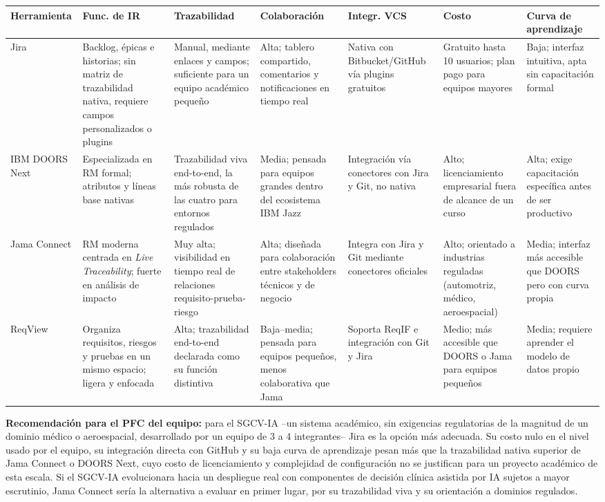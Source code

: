 \documentclass[11pt,a4paper]{article}
\begin{document}
{\footnotesize
\setlength{\tabcolsep}{3pt}
\begin{longtable}{p{1.7cm}p{2.1cm}p{2.1cm}p{2.1cm}p{2.1cm}p{1.7cm}p{1.9cm}}
\toprule
\textbf{Herramienta} & \textbf{Func. de IR} & \textbf{Trazabilidad} & \textbf{Colaboración} & \textbf{Integr. VCS} & \textbf{Costo} & \textbf{Curva de aprendizaje} \\
\midrule
\endhead
Jira &
Backlog, épicas e historias; sin matriz de trazabilidad nativa, requiere campos personalizados o plugins &
Manual, mediante enlaces y campos; suficiente para un equipo académico pequeño &
Alta; tablero compartido, comentarios y notificaciones en tiempo real &
Nativa con Bitbucket/GitHub vía plugins gratuitos &
Gratuito hasta 10 usuarios; plan pago para equipos mayores &
Baja; interfaz intuitiva, apta sin capacitación formal \\
\addlinespace
IBM DOORS Next &
Especializada en RM formal; atributos y líneas base nativas &
Trazabilidad viva end-to-end, la más robusta de las cuatro para entornos regulados &
Media; pensada para equipos grandes dentro del ecosistema IBM Jazz &
Integración vía conectores con Jira y Git, no nativa &
Alto; licenciamiento empresarial fuera de alcance de un curso &
Alta; exige capacitación específica antes de ser productivo \\
\addlinespace
Jama Connect &
RM moderna centrada en \textit{Live Traceability}; fuerte en análisis de impacto &
Muy alta; visibilidad en tiempo real de relaciones requisito-prueba-riesgo &
Alta; diseñada para colaboración entre stakeholders técnicos y de negocio &
Integra con Jira y Git mediante conectores oficiales &
Alto; orientado a industrias reguladas (automotriz, médico, aeroespacial) &
Media; interfaz más accesible que DOORS pero con curva propia \\
\addlinespace
ReqView &
Organiza requisitos, riesgos y pruebas en un mismo espacio; ligera y enfocada &
Alta; trazabilidad end-to-end declarada como su función distintiva &
Baja--media; pensada para equipos pequeños, menos colaborativa que Jama &
Soporta ReqIF e integración con Git y Jira &
Medio; más accesible que DOORS o Jama para equipos pequeños &
Media; requiere aprender el modelo de datos propio \\
\bottomrule
\end{longtable}
}

\textbf{Recomendación para el PFC del equipo:} para el SGCV-IA --un sistema
académico, sin exigencias regulatorias de la magnitud de un dominio médico o
aeroespacial, desarrollado por un equipo de 3 a 4 integrantes-- Jira es la
opción más adecuada. Su costo nulo en el nivel usado por el equipo, su
integración directa con GitHub y su baja curva de aprendizaje pesan más que la
trazabilidad nativa superior de Jama Connect o DOORS Next, cuyo costo de
licenciamiento y complejidad de configuración no se justifican para un proyecto
académico de esta escala. Si el SGCV-IA evolucionara hacia un despliegue
real con componentes de decisión clínica asistida por IA sujetos a mayor
escrutinio, Jama Connect sería la alternativa a evaluar en primer lugar, por su
trazabilidad viva y su orientación a dominios regulados.
\end{document}
